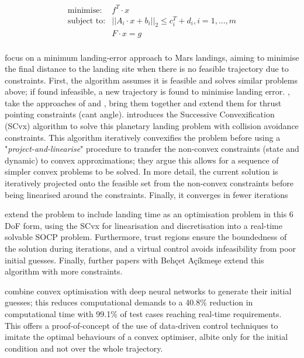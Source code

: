 \begin{equation}
\begin{aligned}
    \text{minimise:}& f^T \cdot x \\
    \text{subject to:}& ||A_i \cdot x + b_i||_2 \leq c_i^T + d_i, i = 1, ..., m \\
    & F \cdot x = g \\
\end{aligned}
\label{eq:SOCP}
\end{equation}

\cite{Blackmore2010} focus on a minimum landing-error approach to Mars landings, aiming to minimise the final distance to the landing site when there is no feasible trajectory due to constraints. First, the algorithm assumes it is feasible and solves similar problems above; if found infeasible, a new trajectory is found to minimise landing error. \cite{Acikmese2013}, take the approaches of \cite{Acikmese2007} and \cite{Blackmore2010}, bring them together and extend them for thrust pointing constraints (cant angle). \cite{mao2017successive} introduces the Successive Convexification (SCvx) algorithm to solve this planetary landing problem with collision avoidance constraints. This algorithm iteratively convexifies the problem before using a "\textit{project-and-linearise}" procedure to transfer the non-convex constraints (state and dynamic) to convex approximations; they argue this allows for a sequence of simpler convex problems to be solved. In more detail, the current solution is iteratively projected onto the feasible set from the non-convex constraints before being linearised around the constraints. Finally, it converges in fewer iterations


\cite{Szmuk_2018} extend the problem to include landing time as an optimisation problem in this 6 DoF form, using the SCvx for linearisation and discretisation into a real-time solvable SOCP problem. Furthermore, trust regions ensure the boundedness of the solution during iterations, and a virtual control avoids infeasibility from poor initial guesses. Finally, further papers with Beh\c{c}et A\c{c}\'{i}kme\c{s}e extend this algorithm with more constraints.

\cite{shen2022realtime} combine convex optimisation with deep neural networks to generate their initial guesses; this reduces computational demands to a 40.8\% reduction in computational time with 99.1\% of test cases reaching real-time requirements. This offers a proof-of-concept of the use of data-driven control techniques to imitate the optimal behaviours of a convex optimiser, albite only for the initial condition and not over the whole trajectory.

